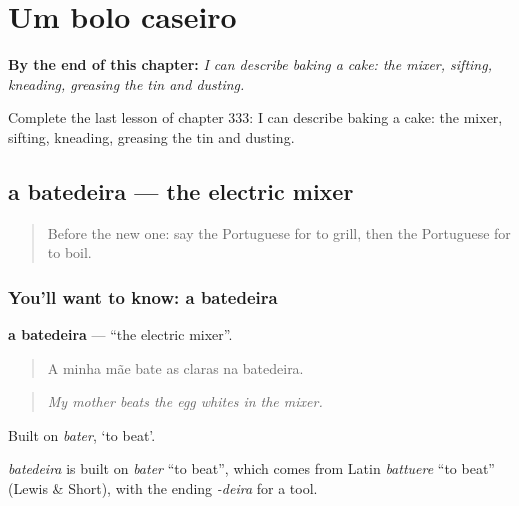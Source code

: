 
\chapter{Um bolo caseiro}
\label{ch:pt-um-bolo-caseiro}

\begin{chapteropening}
\textbf{By the end of this chapter:} \emph{I can describe baking a cake: the mixer, sifting, kneading, greasing the tin and dusting.}

Complete the last lesson of chapter 333: I can describe baking a cake: the mixer, sifting, kneading, greasing the tin and dusting.
\end{chapteropening}

\section[a batedeira]{a batedeira — the electric mixer}

\label{lesson:PT-C333-batedeira}



\begin{quote}
Before the new one: say the Portuguese for to grill, then the Portuguese for to boil.
\end{quote}

\subsection*{You'll want to know: a batedeira}
\textbf{a batedeira} — \textquotedblleft{}the electric mixer\textquotedblright{}.

\begin{quote}
A minha mãe bate as claras na batedeira.
\end{quote}

\begin{quote}
\emph{My mother beats the egg whites in the mixer.}
\end{quote}

Built on \emph{bater}, ‘to beat’.

\begin{cousinweb}
\emph{batedeira} is built on \emph{bater} \textquotedblleft{}to beat\textquotedblright{}, which comes from Latin \emph{battuere} \textquotedblleft{}to beat\textquotedblright{} (Lewis \& Short), with the ending \emph{-deira} for a tool.
\end{cousinweb}

